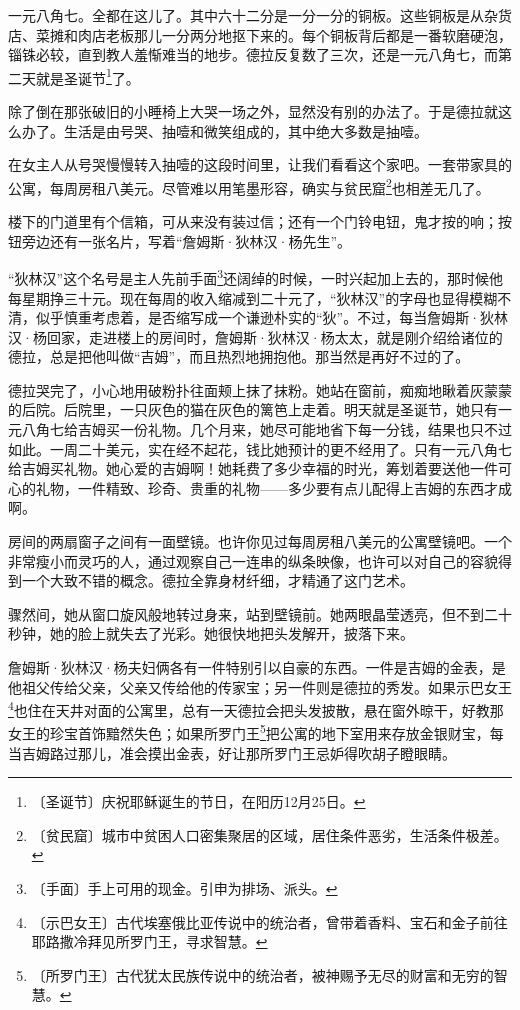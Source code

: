 \documentclass[12pt,UTF-8,openany]{ctexbook}
\begin{document}
\begin{normalsize}
    
    一元八角七。全都在这儿了。其中六十二分是一分一分的铜板。这些铜板是从杂货店、菜摊和肉店老板那儿一分两分地抠下来的。每个铜板背后都是一番软磨硬泡，锱铢必较，直到教人羞惭难当的地步。德拉反复数了三次，还是一元八角七，而第二天就是圣诞节\footnote{〔圣诞节〕庆祝耶稣诞生的节日，在阳历12月25日。}了。
    
    除了倒在那张破旧的小睡椅上大哭一场之外，显然没有别的办法了。于是德拉就这么办了。生活是由号哭、抽噎和微笑组成的，其中绝大多数是抽噎。
    
    在女主人从号哭慢慢转入抽噎的这段时间里，让我们看看这个家吧。一套带家具的公寓，每周房租八美元。尽管难以用笔墨形容，确实与贫民窟\footnote{〔贫民窟〕城市中贫困人口密集聚居的区域，居住条件恶劣，生活条件极差。}也相差无几了。
    
    楼下的门道里有个信箱，可从来没有装过信；还有一个门铃电钮，鬼才按的响；按钮旁边还有一张名片，写着“詹姆斯·狄林汉·杨先生”。
    
    “狄林汉”这个名号是主人先前手面\footnote{〔手面〕手上可用的现金。引申为排场、派头。}还阔绰的时候，一时兴起加上去的，那时候他每星期挣三十元。现在每周的收入缩减到二十元了，“狄林汉”的字母也显得模糊不清，似乎慎重考虑着，是否缩写成一个谦逊朴实的“狄”。不过，每当詹姆斯·狄林汉·杨回家，走进楼上的房间时，詹姆斯·狄林汉·杨太太，就是刚介绍给诸位的德拉，总是把他叫做“吉姆”，而且热烈地拥抱他。那当然是再好不过的了。
    
    德拉哭完了，小心地用破粉扑往面颊上抹了抹粉。她站在窗前，痴痴地瞅着灰蒙蒙的后院。后院里，一只灰色的猫在灰色的篱笆上走着。明天就是圣诞节，她只有一元八角七给吉姆买一份礼物。几个月来，她尽可能地省下每一分钱，结果也只不过如此。一周二十美元，实在经不起花，钱比她预计的更不经用了。只有一元八角七给吉姆买礼物。她心爱的吉姆啊！她耗费了多少幸福的时光，筹划着要送他一件可心的礼物，一件精致、珍奇、贵重的礼物——多少要有点儿配得上吉姆的东西才成啊。
    
    房间的两扇窗子之间有一面壁镜。也许你见过每周房租八美元的公寓壁镜吧。一个非常瘦小而灵巧的人，通过观察自己一连串的纵条映像，也许可以对自己的容貌得到一个大致不错的概念。德拉全靠身材纤细，才精通了这门艺术。
    
    骤然间，她从窗口旋风般地转过身来，站到壁镜前。她两眼晶莹透亮，但不到二十秒钟，她的脸上就失去了光彩。她很快地把头发解开，披落下来。
    
    詹姆斯·狄林汉·杨夫妇俩各有一件特别引以自豪的东西。一件是吉姆的金表，是他祖父传给父亲，父亲又传给他的传家宝；另一件则是德拉的秀发。如果示巴女王\footnote{〔示巴女王〕古代埃塞俄比亚传说中的统治者，曾带着香料、宝石和金子前往耶路撒冷拜见所罗门王，寻求智慧。}也住在天井对面的公寓里，总有一天德拉会把头发披散，悬在窗外晾干，好教那女王的珍宝首饰黯然失色；如果所罗门王\footnote{〔所罗门王〕古代犹太民族传说中的统治者，被神赐予无尽的财富和无穷的智慧。}把公寓的地下室用来存放金银财宝，每当吉姆路过那儿，准会摸出金表，好让那所罗门王忌妒得吹胡子瞪眼睛。
    

\end{normalsize}
\end{document}
